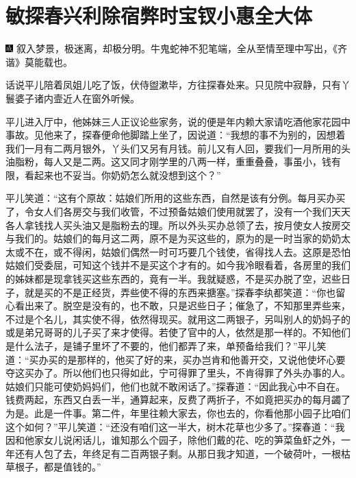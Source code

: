 

\chapter{敏探春兴利除宿弊\hspace{.5em}时宝钗小惠全大体}

{\includegraphics[width=3mm]{../Images/00005}  \kaishu 叙入梦景，极迷离，却极分明。牛鬼蛇神不犯笔端，全从至情至理中写出，《齐谐》莫能载也。}

话说平儿陪着凤姐儿吃了饭，伏侍盥漱毕，方往探春处来。只见院中寂静，只有丫鬟婆子诸内壸近人在窗外听候。

平儿进入厅中，他姊妹三人正议论些家务，说的便是年内赖大家请吃酒他家花园中事故。见他来了，探春便命他脚踏上坐了，因说道：“我想的事不为别的，因想着我们一月有二两月银外，丫头们又另有月钱。前儿又有人回，要我们一月所用的头油脂粉，每人又是二两。这又同才刚学里的八两一样，重重叠叠，事虽小，钱有限，看起来也不妥当。你奶奶怎么就没想到这个？”

平儿笑道：“这有个原故：姑娘们所用的这些东西，自然是该有分例。每月买办买了，令女人们各房交与我们收管，不过预备姑娘们使用就罢了，没有一个我们天天各人拿钱找人买头油又是脂粉去的理。所以外头买办总领了去，按月使女人按房交与我们的。姑娘们的每月这二两，原不是为买这些的，原为的是一时当家的奶奶太太或不在，或不得闲，姑娘们偶然一时可巧要几个钱使，省得找人去。这原是恐怕姑娘们受委屈，可知这个钱并不是买这个才有的。如今我冷眼看着，各房里的我们的姊妹都是现拿钱买这些东西的，竟有一半。我就疑惑，不是买办脱了空，迟些日子，就是买的不是正经货，弄些使不得的东西来搪塞。”探春李纨都笑道：“你也留心看出来了。脱空是没有的，也不敢，只是迟些日子；催急了，不知那里弄些来，不过是个名儿，其实使不得，依然得现买。就用这二两银子，另叫别人的奶妈子的或是弟兄哥哥的儿子买了来才使得。若使了官中的人，依然是那一样的。不知他们是什么法子，是铺子里坏了不要的，他们都弄了来，单预备给我们？”平儿笑道：“买办买的是那样的，他买了好的来，买办岂肯和他善开交，又说他使坏心要夺这买办了。所以他们也只得如此，宁可得罪了里头，不肯得罪了外头办事的人。姑娘们只能可使奶妈妈们，他们也就不敢闲话了。”探春道：“因此我心中不自在。钱费两起，东西又白丢一半，通算起来，反费了两折子，不如竟把买办的每月蠲了为是。此是一件事。第二件，年里往赖大家去，你也去的，你看他那小园子比咱们这个如何？”平儿笑道：“还没有咱们这一半大，树木花草也少多了。”探春道：“我因和他家女儿说闲话儿，谁知那么个园子，除他们戴的花、吃的笋菜鱼虾之外，一年还有人包了去，年终足有二百两银子剩。从那日我才知道，一个破荷叶，一根枯草根子，都是值钱的。”

